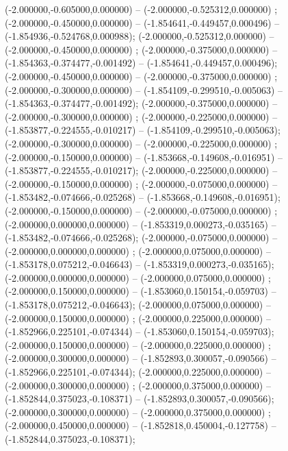  (-2.000000,-0.605000,0.000000) -- (-2.000000,-0.525312,0.000000) ;
 (-2.000000,-0.450000,0.000000) -- (-1.854641,-0.449457,0.000496) -- (-1.854936,-0.524768,0.000988);
 (-2.000000,-0.525312,0.000000) -- (-2.000000,-0.450000,0.000000) ;
 (-2.000000,-0.375000,0.000000) -- (-1.854363,-0.374477,-0.001492) -- (-1.854641,-0.449457,0.000496);
 (-2.000000,-0.450000,0.000000) -- (-2.000000,-0.375000,0.000000) ;
 (-2.000000,-0.300000,0.000000) -- (-1.854109,-0.299510,-0.005063) -- (-1.854363,-0.374477,-0.001492);
 (-2.000000,-0.375000,0.000000) -- (-2.000000,-0.300000,0.000000) ;
 (-2.000000,-0.225000,0.000000) -- (-1.853877,-0.224555,-0.010217) -- (-1.854109,-0.299510,-0.005063);
 (-2.000000,-0.300000,0.000000) -- (-2.000000,-0.225000,0.000000) ;
 (-2.000000,-0.150000,0.000000) -- (-1.853668,-0.149608,-0.016951) -- (-1.853877,-0.224555,-0.010217);
 (-2.000000,-0.225000,0.000000) -- (-2.000000,-0.150000,0.000000) ;
 (-2.000000,-0.075000,0.000000) -- (-1.853482,-0.074666,-0.025268) -- (-1.853668,-0.149608,-0.016951);
 (-2.000000,-0.150000,0.000000) -- (-2.000000,-0.075000,0.000000) ;
 (-2.000000,0.000000,0.000000) -- (-1.853319,0.000273,-0.035165) -- (-1.853482,-0.074666,-0.025268);
 (-2.000000,-0.075000,0.000000) -- (-2.000000,0.000000,0.000000) ;
 (-2.000000,0.075000,0.000000) -- (-1.853178,0.075212,-0.046643) -- (-1.853319,0.000273,-0.035165);
 (-2.000000,0.000000,0.000000) -- (-2.000000,0.075000,0.000000) ;
 (-2.000000,0.150000,0.000000) -- (-1.853060,0.150154,-0.059703) -- (-1.853178,0.075212,-0.046643);
 (-2.000000,0.075000,0.000000) -- (-2.000000,0.150000,0.000000) ;
 (-2.000000,0.225000,0.000000) -- (-1.852966,0.225101,-0.074344) -- (-1.853060,0.150154,-0.059703);
 (-2.000000,0.150000,0.000000) -- (-2.000000,0.225000,0.000000) ;
 (-2.000000,0.300000,0.000000) -- (-1.852893,0.300057,-0.090566) -- (-1.852966,0.225101,-0.074344);
 (-2.000000,0.225000,0.000000) -- (-2.000000,0.300000,0.000000) ;
 (-2.000000,0.375000,0.000000) -- (-1.852844,0.375023,-0.108371) -- (-1.852893,0.300057,-0.090566);
 (-2.000000,0.300000,0.000000) -- (-2.000000,0.375000,0.000000) ;
 (-2.000000,0.450000,0.000000) -- (-1.852818,0.450004,-0.127758) -- (-1.852844,0.375023,-0.108371);
